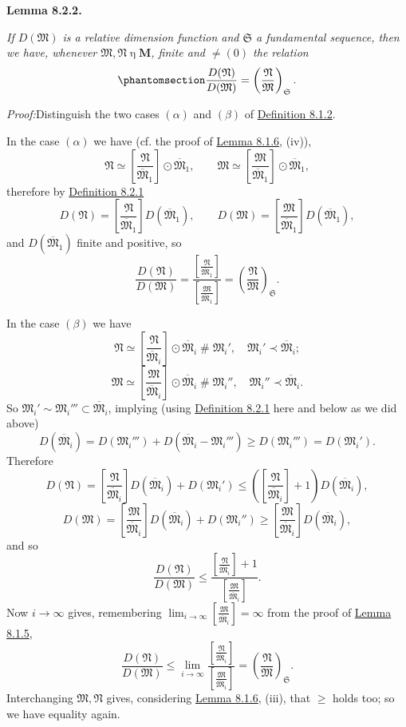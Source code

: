 \documentclass[12pt,b5paper,twoside]{article}
\newcommand{\M}{\mathbf M}
\newcommand{\reldiv}[2]{\left[\frac{#1}{#2}\right]}
\newcommand{\Lemma}[1]{%
  \par\smallskip\noindent\phantomsection\label{lem:#1}\textbf{Lemma #1.}\enspace
}
\newcommand{\Proof}{\par\noindent\textit{Proof:}\enspace}
\newcommand{\defref}[1]{\hyperref[def:#1]{Definition #1}}
\newcommand{\lemref}[1]{\hyperref[lem:#1]{Lemma #1}}
\begin{document}
\Lemma{8.2.2}
{\itshape
If $D(\mathfrak M)$ is a relative dimension function and $\mathfrak S$ a
fundamental sequence, then we have, whenever
$\mathfrak M,\mathfrak N\mathbin\eta\M$, finite and $\ne(0)$ the relation
\begin{equation*}
 \phantomsection\label{eq:8.2.1}
 \frac{D(\mathfrak N)}{D(\mathfrak M)}
 =\left(\frac{\mathfrak N}{\mathfrak M}\right)_{\mathfrak S}.
\end{equation*}}

\Proof Distinguish the two cases $(\alpha)$ and $(\beta)$ of \defref{8.1.2}.

In the case $(\alpha)$ we have (cf. the proof of \lemref{8.1.6}, (iv)),
\[
 \mathfrak N\simeq\reldiv{\mathfrak N}{\overline{\mathfrak M}_1}
 \odot\overline{\mathfrak M}_1,
 \qquad
 \mathfrak M\simeq\reldiv{\mathfrak M}{\overline{\mathfrak M}_1}
 \odot\overline{\mathfrak M}_1,
\]
therefore by \defref{8.2.1}
\[
 D(\mathfrak N)=\reldiv{\mathfrak N}{\overline{\mathfrak M}_1}
 D(\overline{\mathfrak M}_1),
 \qquad
 D(\mathfrak M)=\reldiv{\mathfrak M}{\overline{\mathfrak M}_1}
 D(\overline{\mathfrak M}_1),
\]
and $D(\overline{\mathfrak M}_1)$ finite and positive, so
\[
 \frac{D(\mathfrak N)}{D(\mathfrak M)}
 =\frac{\reldiv{\mathfrak N}{\overline{\mathfrak M}_1}}
       {\reldiv{\mathfrak M}{\overline{\mathfrak M}_1}}
 =\left(\frac{\mathfrak N}{\mathfrak M}\right)_{\mathfrak S}.
\]

In the case $(\beta)$ we have
\[
 \mathfrak N\simeq\reldiv{\mathfrak N}{\overline{\mathfrak M}_i}
 \odot\overline{\mathfrak M}_i\mathbin{\#}\mathfrak M_i',
 \quad \mathfrak M_i'\prec\overline{\mathfrak M}_i;
\]
\[
 \mathfrak M\simeq\reldiv{\mathfrak M}{\overline{\mathfrak M}_i}
 \odot\overline{\mathfrak M}_i\mathbin{\#}\mathfrak M_i'',
 \quad \mathfrak M_i''\prec\overline{\mathfrak M}_i.
\]
So $\mathfrak M_i'\sim\mathfrak M_i'''\subset\overline{\mathfrak M}_i$,
implying (using \defref{8.2.1} here and below as we did above)
\[
 D(\overline{\mathfrak M}_i)
 =D(\mathfrak M_i''')+D(\overline{\mathfrak M}_i-\mathfrak M_i''')
 \geq D(\mathfrak M_i''')=D(\mathfrak M_i').
\]
Therefore
\[
 D(\mathfrak N)
 =\reldiv{\mathfrak N}{\overline{\mathfrak M}_i}
   D(\overline{\mathfrak M}_i)+D(\mathfrak M_i')
 \leq\left(\reldiv{\mathfrak N}{\overline{\mathfrak M}_i}+1\right)
   D(\overline{\mathfrak M}_i),
\]
\[
 D(\mathfrak M)
 =\reldiv{\mathfrak M}{\overline{\mathfrak M}_i}
   D(\overline{\mathfrak M}_i)+D(\mathfrak M_i'')
 \geq\reldiv{\mathfrak M}{\overline{\mathfrak M}_i}
   D(\overline{\mathfrak M}_i),
\]
and so
\[
 \frac{D(\mathfrak N)}{D(\mathfrak M)}
 \leq
 \frac{\reldiv{\mathfrak N}{\overline{\mathfrak M}_i}+1}
      {\reldiv{\mathfrak M}{\overline{\mathfrak M}_i}}.
\]
Now $i\to\infty$ gives, remembering
$\lim_{i\to\infty}\reldiv{\mathfrak M}{\overline{\mathfrak M}_i}=\infty$
from the proof of \lemref{8.1.5},
\[
 \frac{D(\mathfrak N)}{D(\mathfrak M)}
 \leq\lim_{i\to\infty}
 \frac{\reldiv{\mathfrak N}{\overline{\mathfrak M}_i}}
      {\reldiv{\mathfrak M}{\overline{\mathfrak M}_i}}
 =\left(\frac{\mathfrak N}{\mathfrak M}\right)_{\mathfrak S}.
\]
Interchanging $\mathfrak M,\mathfrak N$ gives, considering \lemref{8.1.6},
(iii), that $\geq$ holds too; so we have equality again.
\end{document}
